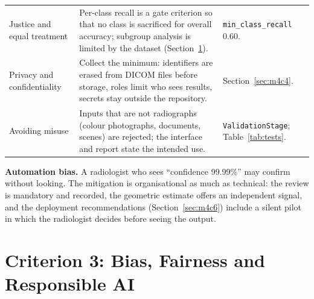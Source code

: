 \documentclass[12pt,a4paper]{article}
\begin{document}
\begin{table}[H]
\begin{tabularx}{\textwidth}{L{2.6cm} Y Y}
Justice and equal treatment & Per-class recall is a gate criterion so that no class is sacrificed for overall accuracy; subgroup analysis is limited by the dataset (Section~\ref{sec:m4c3}). & \texttt{min\_class\_recall} 0.60. \\
Privacy and confidentiality & Collect the minimum: identifiers are erased from DICOM files before storage, roles limit who sees results, secrets stay outside the repository. & Section~\ref{sec:m4c4}. \\
Avoiding misuse & Inputs that are not radiographs (colour photographs, documents, scenes) are rejected; the interface and report state the intended use. & \texttt{ValidationStage}; Table~\ref{tab:tests}. \\
\end{tabularx}
\end{table}

\noindent\textbf{Automation bias.} A radiologist who sees ``confidence 99.99\%'' may confirm without looking. The mitigation is organisational as much as technical: the review is mandatory and recorded,
the geometric estimate offers an independent signal, and the deployment recommendations (Section~\ref{sec:m4c6}) include a silent pilot in which the radiologist decides before seeing the output.

\section{Criterion 3: Bias, Fairness and Responsible AI}
\label{sec:m4c3}
\end{document}

